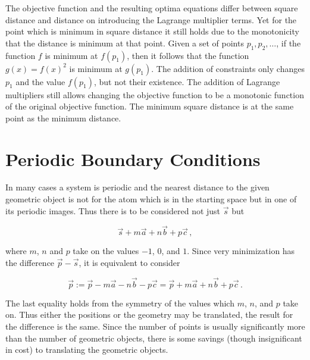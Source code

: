 \documentclass{article}
\begin{document}
The objective function and the resulting optima equations differ between square distance and distance on introducing the Lagrange multiplier terms. Yet for the point which is minimum in square distance it still holds due to the monotonicity that the distance is minimum at that point. Given a set of points $p_1,p_2,\ldots$, if the function $f$ is minimum at $f(p_1)$, then it follows that the function $g(x) = f(x)^2$ is minimum at $g(p_1)$. The addition of constraints only changes $p_1$ and the value $f(p_1)$, but not their existence. The addition of Lagrange multipliers still allows changing the objective function to be a monotonic function of the original objective function. The minimum square distance is at the same point as the minimum distance.

\section{Periodic Boundary Conditions}

In many cases a system is periodic and the nearest distance to the given geometric object is not for the atom which is in the starting space but in one of its periodic images. Thus there is to be considered not just $\vec s$ but

$$ \vec s + m\vec a + n\vec b + p\vec c\,,$$

where $m$, $n$ and $p$ take on the values $-1$, $0$, and $1$. Since very minimization has the difference $\vec{p} - \vec{s}$, it is equivalent to consider

$$\vec{p} := \vec p - m\vec a - n\vec b - p \vec c = \vec p + m \vec a + n \vec b + p \vec c \,. $$

The last equality holds from the symmetry of the values which $m$, $n$, and $p$ take on. Thus either the positions or the geometry may be translated, the result for the difference is the same. Since the number of points is usually significantly more than the number of geometric objects, there is some savings (though insignificant in cost) to translating the geometric objects.
\end{document}
